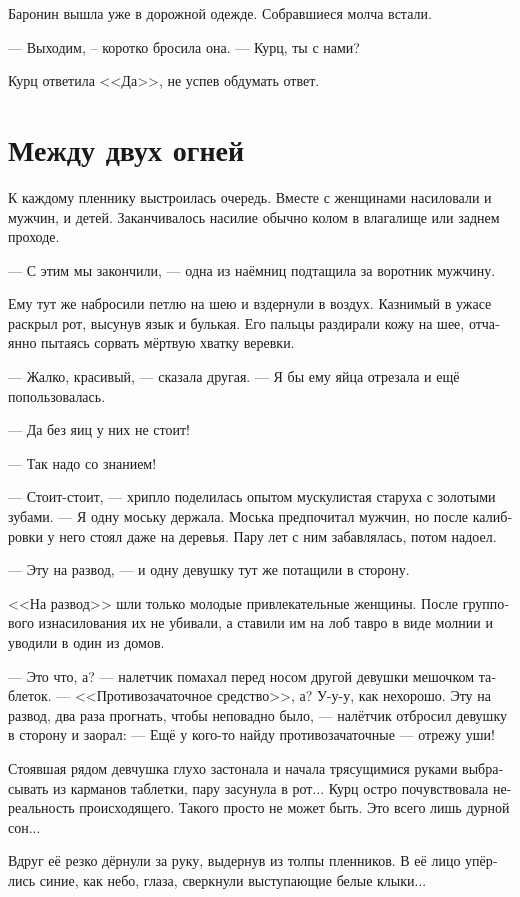 \documentclass[a4paper,12pt,fleqn]{book}\usepackage{cooltooltips}\usepackage{polyglossia}\setdefaultlanguage[babelshorthands=true]{russian}\setotherlanguage{english}\defaultfontfeatures{Ligatures=TeX,Mapping=tex-text} \usepackage{xcolor}\definecolor{lightgray}{HTML}{bbbbbb}\color{lightgray}\newcommand{\ml}[3]{\textenglish{\textcolor{black}{#3}}}
\begin{document}
Баронин вышла уже в дорожной одежде.
Собравшиеся молча встали.

--- Выходим, -- коротко бросила она.
--- Курц, ты с нами?

Курц ответила <<Да>>, не успев обдумать ответ.

\section{Между двух огней}

К каждому пленнику выстроилась очередь.
Вместе с женщинами насиловали и мужчин, и детей.
Заканчивалось насилие обычно колом в влагалище или заднем проходе.

--- С этим мы закончили, --- одна из наёмниц подтащила за воротник мужчину.

Ему тут же набросили петлю на шею и вздернули в воздух.
Казнимый в ужасе раскрыл рот, высунув язык и булькая.
Его пальцы раздирали кожу на шее, отчаянно пытаясь сорвать мёртвую хватку веревки.

--- Жалко, красивый, --- сказала другая.
--- Я бы ему яйца отрезала и ещё попользовалась.

--- Да без яиц у них не стоит!

--- Так надо со знанием!

--- Стоит-стоит, --- хрипло поделилась опытом мускулистая старуха с золотыми зубами.
--- Я одну моську держала.
Моська предпочитал мужчин, но после калибровки у него стоял даже на деревья.
Пару лет с ним забавлялась, потом надоел.

--- Эту на развод, --- и одну девушку тут же потащили в сторону.

<<На развод>> шли только молодые привлекательные женщины.
После группового изнасилования их не убивали, а ставили им на лоб тавро в виде молнии и уводили в один из домов.

--- Это что, а? --- налетчик помахал перед носом другой девушки мешочком таблеток.
--- <<Противозачаточное средство>>, а?
У-у-у, как нехорошо.
Эту на развод, два раза прогнать, чтобы неповадно было, --- налётчик отбросил девушку в сторону и заорал:
--- Ещё у кого-то найду противозачаточные --- отрежу уши!

Стоявшая рядом девчушка глухо застонала и начала трясущимися руками выбрасывать из карманов таблетки, пару засунула в рот...
Курц остро почувствовала нереальность происходящего.
Такого просто не может быть.
Это всего лишь дурной сон...

Вдруг её резко дёрнули за руку, выдернув из толпы пленников.
В её лицо упёрлись синие, как небо, глаза, сверкнули выступающие белые клыки...
\end{document}
